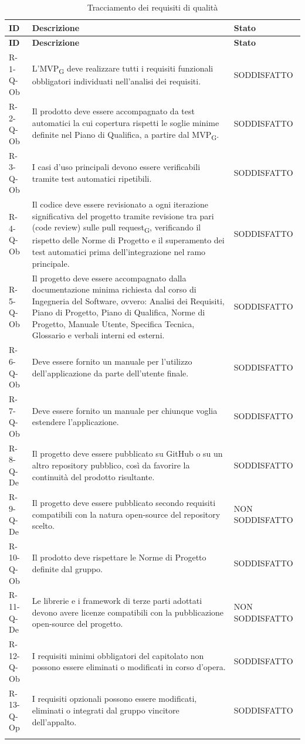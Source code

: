 \documentclass[a4paper, 10pt]{article}
\begin{document}
\begin{longtable}{|p{2.1cm}|p{9.6cm}|p{2.6cm}|}
    \hline
    \rowcolor{gray!15}
    \textbf{ID} & \textbf{Descrizione} & \textbf{Stato} \\
    \hline
    \endfirsthead
    \hline
    \rowcolor{gray!15}
    \textbf{ID} & \textbf{Descrizione} & \textbf{Stato} \\
    \hline
    \endhead
    R-1-Q-Ob & L'MVP\textsubscript{G} deve realizzare tutti i requisiti funzionali obbligatori individuati nell'analisi dei requisiti. & SODDISFATTO \\ \hline
    R-2-Q-Ob & Il prodotto deve essere accompagnato da test automatici la cui copertura rispetti le soglie minime definite nel Piano di Qualifica, a partire dal MVP\textsubscript{G}. & SODDISFATTO \\ \hline
    R-3-Q-Ob & I casi d'uso principali devono essere verificabili tramite test automatici ripetibili. & SODDISFATTO \\ \hline
    R-4-Q-Ob & Il codice deve essere revisionato a ogni iterazione significativa del progetto tramite revisione tra pari (code review) sulle pull request\textsubscript{G}, verificando il rispetto delle Norme di Progetto e il superamento dei test automatici prima dell'integrazione nel ramo principale. & SODDISFATTO \\ \hline
    R-5-Q-Ob & Il progetto deve essere accompagnato dalla documentazione minima richiesta dal corso di Ingegneria del Software, ovvero: Analisi dei Requisiti, Piano di Progetto, Piano di Qualifica, Norme di Progetto, Manuale Utente, Specifica Tecnica, Glossario e verbali interni ed esterni. & SODDISFATTO \\ \hline
    R-6-Q-Ob & Deve essere fornito un manuale per l'utilizzo dell'applicazione da parte dell'utente finale. & SODDISFATTO \\ \hline
    R-7-Q-Ob & Deve essere fornito un manuale per chiunque voglia estendere l'applicazione. & SODDISFATTO \\ \hline
    R-8-Q-De & Il progetto deve essere pubblicato su GitHub o su un altro repository pubblico, così da favorire la continuità del prodotto risultante. & SODDISFATTO \\ \hline
    R-9-Q-De & Il progetto deve essere pubblicato secondo requisiti compatibili con la natura open-source del repository scelto. & NON SODDISFATTO \\ \hline
    R-10-Q-Ob & Il prodotto deve rispettare le Norme di Progetto definite dal gruppo. & SODDISFATTO \\ \hline
    R-11-Q-De & Le librerie e i framework di terze parti adottati devono avere licenze compatibili con la pubblicazione open-source del progetto. & NON SODDISFATTO \\ \hline
    R-12-Q-Ob & I requisiti minimi obbligatori del capitolato non possono essere eliminati o modificati in corso d'opera. & SODDISFATTO \\ \hline
    R-13-Q-Op & I requisiti opzionali possono essere modificati, eliminati o integrati dal gruppo vincitore dell'appalto. & SODDISFATTO \\ \hline
    \caption{Tracciamento dei requisiti di qualit\`a}\label{tab:tracciamento-qualita}
\end{longtable}
\end{document}
